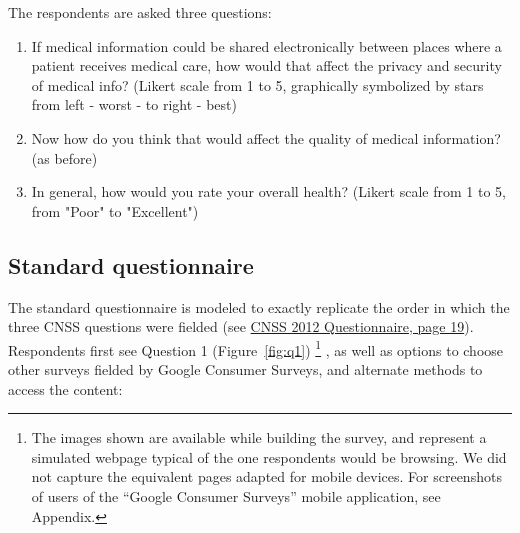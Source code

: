 The respondents are asked three questions:

\begin{enumerate}
	\item If medical information could be shared electronically between places where a patient receives medical care, how would that affect the privacy and security of medical info?
(Likert scale from 1 to 5, graphically symbolized by stars from left - worst - to right - best)

\item Now how do you think that would affect the quality of medical information?
(as before)

\item In general, how would you rate your overall health?
(Likert scale from 1 to 5, from "Poor" to "Excellent")
\end{enumerate}

\subsection{Standard questionnaire}
The standard questionnaire is modeled to exactly replicate the order in which the three CNSS questions were fielded (see \href{https://www.sri.cornell.edu/sri/files/cnss/2012/CNSS2012questionnaire.pdf#page=19}{CNSS 2012 Questionnaire, page 19}). Respondents first see Question 1 (Figure~\ref{fig:q1})%
\footnote{The images shown are available while building the survey, and represent a simulated webpage typical of the one respondents would be browsing. We did not capture the equivalent pages adapted for mobile devices. For screenshots of users of the ``Google Consumer Surveys'' mobile application, see Appendix.}
, as well as options to choose other surveys fielded by Google Consumer Surveys, and alternate methods to access the content:


